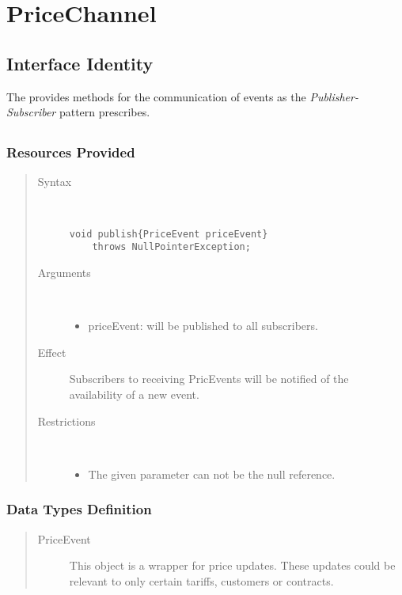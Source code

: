 \section{PriceChannel}
\label{api:other-pric-channel}

\subsection{Interface Identity}

\npar The  provides methods for the communication of
events as the \emph{Publisher-Subscriber} pattern prescribes.

\subsection{}

\subsubsection{Resources Provided}

\begin{quote}
	\begin{description}
		\item[Syntax] \
		\begin{verbatim}
void publish{PriceEvent priceEvent}
    throws NullPointerException;
		\end{verbatim}
		\item[Arguments] \
		\begin{itemize}
		  \item priceEvent: will be published to all subscribers.
		\end{itemize}
		\item[Effect] Subscribers to receiving PricEvents will be notified of
		the availability of a new event. 
		\item[Restrictions] \
		\begin{itemize}
		  \item The given parameter can not be the null reference.
		\end{itemize}
	\end{description}
\end{quote}

\subsubsection{Data Types Definition}

\begin{quote}
	\begin{description}
		\item[PriceEvent] This object is a wrapper for price updates. These updates
		could be relevant to only certain tariffs, customers or contracts.
	\end{description} 
\end{quote}

